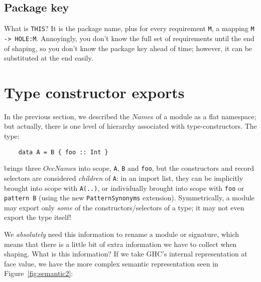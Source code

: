 \documentclass{article}
\newcommand{\I}[1]{\ensuremath{\mathit{#1}}}
\begin{document}
\subsection{Package key}

What is \verb|THIS|?  It is the package name, plus for every requirement \verb|M|,
a mapping \verb|M -> HOLE:M|.  Annoyingly, you don't know the full set of
requirements until the end of shaping, so you don't know the package key ahead of time;
however, it can be substituted at the end easily.

\clearpage
\newpage

\section{Type constructor exports}

In the previous section, we described the \I{Name}s of a
module as a flat namespace; but actually, there is one level of
hierarchy associated with type-constructors.  The type:

\begin{verbatim}
    data A = B { foo :: Int }
\end{verbatim}
%
brings three \I{OccName}s into scope, \verb|A|, \verb|B|
and \verb|foo|, but the constructors and record selectors are
considered \emph{children}
of \verb|A|: in an import list, they can be implicitly brought
into scope with \verb|A(..)|, or individually brought into
scope with \verb|foo| or \verb|pattern B| (using the new \verb|PatternSynonyms|
extension).  Symmetrically, a module may export only \emph{some}
of the constructors/selectors of a type; it may not even
export the type itself!

We \emph{absolutely} need this information to rename a module or
signature, which means that there is a little bit of extra information
we have to collect when shaping.  What is this information?  If we take
GHC's internal representation at face value, we have the more complex
semantic representation seen in Figure~\ref{fig:semantic2}:
\end{document}
